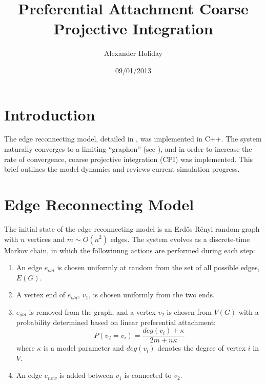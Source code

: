 \documentclass[11pt]{article}
\begin{document}
\title{Preferential Attachment Coarse Projective Integration}
\author{Alexander Holiday\vspace{-2ex}}
\date{09/01/2013}
\maketitle
\section*{Introduction}
The edge reconnecting model, detailed in \cite{balasz:rsa12}, was implemented in C++. The system naturally converges to a limiting ``graphon'' (see \cite{lovasz:jcombth06}), and in order to increase the rate of convergence, coarse projective integration (CPI) was implemented. This brief outlines the model dynamics and reviews current simulation progress.

\section*{Edge Reconnecting Model}
The initial state of the edge reconnecting model is an Erd\H{o}s-R\'{e}nyi random graph with $n$ vertices and $m\sim O(n^{2})$ edges. The system evolves as a discrete-time Markov chain, in which the followinnng actions are performed during each step:

\begin{enumerate}
\item An edge $e_{old}$ is chosen uniformly at random from the set of all possible edges, $E(G)$.
\item A vertex end of $e_{old}$, $v_{1}$, is chosen uniformly from the two ends.
\item $e_{old}$ is removed from the graph, and a vertex $v_{2}$ is chosen from $V(G)$ with a probability determined based on linear preferential attachment:
  \[
  P(v_{2}=v_{i})=\frac{deg(v_{i})+\kappa}{2m+n\kappa}
  \]
where $\kappa$ is a model parameter and $deg(v_{i})$ denotes the degree of vertex $i$ in $V$.
\item An edge $e_{new}$ is added between $v_{1}$ is connected to $v_{2}$.
\end{enumerate}
\end{document}
